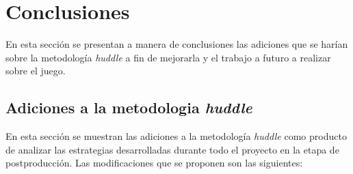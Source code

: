 \chapter{Conclusiones}
En esta sección se presentan a manera de conclusiones las adiciones que se harían 
sobre la metodología \textit{huddle} a fin de mejorarla y el trabajo a futuro a 
realizar sobre el juego.

\section{Adiciones a la metodologia \textit{huddle}}
En esta sección se muestran las adiciones a la metodología \textit{huddle} como 
producto de analizar las estrategias desarrolladas durante todo el proyecto en 
la etapa de postproducción. Las modificaciones que se proponen son las siguientes:


